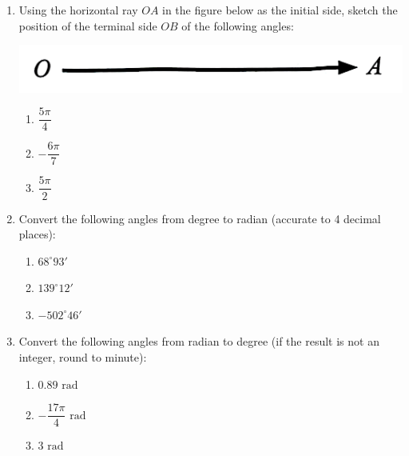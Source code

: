 \documentclass{report}
\begin{document}
\begin{enumerate}
    \item Using the horizontal ray $OA$ in the figure below as the initial side, sketch the position of the terminal side $OB$ of the following angles:
    \begin{center}
        \includegraphics[scale=0.15]{assets/8-4.png}
    \end{center}
    \vspace{-1em}
    \begin{multicols}{3}
        \begin{enumerate}[label=(\alph*)]
            \item $\dfrac{5 \pi}{4}$
            \item $-\dfrac{6 \pi}{7}$
            \item $\dfrac{5 \pi}{2}$
        \end{enumerate}
    \end{multicols}
    
    \item Convert the following angles from degree to radian (accurate to 4 decimal places):
    \vspace{-1em}
    \begin{multicols}{3}
        \begin{enumerate}[label=(\alph*)]
            \item $68^\circ 93'$
            \item $139^\circ 12'$
            \item $-502^\circ 46'$
        \end{enumerate}
    \end{multicols}

    \item Convert the following angles from radian to degree (if the result is not an integer, round to minute):
    \vspace{-1em}
    \begin{multicols}{3}
        \begin{enumerate}[label=(\alph*)]
            \item $0.89 \text{ rad}$
            \item $-\dfrac{17\pi}{4} \text{ rad}$
            \item $3 \text{ rad}$
        \end{enumerate}
    \end{multicols}


\end{enumerate}
\end{document}
